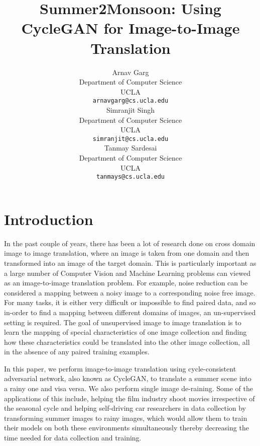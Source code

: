 \documentclass{article}
\title{Summer2Monsoon: Using CycleGAN for Image-to-Image Translation}
\author{
  Arnav Garg \\
  Department of Computer Science\\
  UCLA\\
  \texttt{arnavgarg@cs.ucla.edu} \\
  \And
  Simranjit Singh \\
  Department of Computer Science\\
  UCLA\\
  \texttt{simranjit@cs.ucla.edu} \\
   \And
  Tanmay Sardesai \\
  Department of Computer Science\\
  UCLA\\
  \texttt{tanmays@cs.ucla.edu} \\
}
\begin{document}

\maketitle

\begin{abstract}
 


\end{abstract}

\section{Introduction}

In the past couple of years, there has been a lot of research done on cross domain image to image translation, where an image is taken from one domain and then transformed into an image of the target domain. This is particularly important as a large number of Computer Vision and Machine Learning problems can viewed as an image-to-image translation problem. For example, noise reduction can be considered a mapping between a noisy image to a corresponding noise free image. For many tasks, it is either very difficult or impossible to find paired data, and so in-order to find a mapping between different domains of images, an un-supervised setting is required. The goal of unsupervised image to image translation is to learn the mapping of special characteristics of one image collection and finding how these characteristics could be translated into the other image collection, all in the absence of any paired training examples.

In this paper, we  perform image-to-image translation using cycle-consistent adversarial network, also known as CycleGAN,  to translate a summer scene into a rainy one and visa versa. We also perform single image de-raining. Some of the applications of this include, helping the film industry shoot movies irrespective of the seasonal cycle and helping self-driving car researchers in data collection by transforming summer images to rainy images, which would allow them to train their models on both these environments simultaneously thereby decreasing the time needed for data collection and training.
\end{document}
